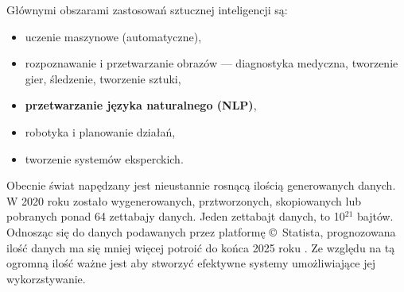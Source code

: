 %
%




\bigskip

\noindent Głównymi obszarami zastosowań sztucznej inteligencji są:
\begin{itemize}
\item uczenie maszynowe (automatyczne),
\item rozpoznawanie i przetwarzanie obrazów --- diagnostyka medyczna, tworzenie gier, śledzenie, tworzenie sztuki,
\item \textbf{przetwarzanie języka naturalnego (NLP)},
\item robotyka i planowanie działań,
\item tworzenie systemów eksperckich.
\end{itemize}


\bigskip

\noindent Obecnie świat napędzany jest nieustannie rosnącą ilością generowanych danych.  W 2020 roku zostało wygenerowanych, prztworzonych, skopiowanych lub pobranych ponad 64 zettabajy danych. Jeden zettabajt danych, to 10$^{21}$ bajtów. Odnosząc się do danych podawanych przez platformę \copyright~Statista, prognozowana ilość danych ma się mniej więcej potroić do końca 2025 roku \cite{Statista}. Ze względu na tą ogromną ilość ważne jest aby stworzyć efektywne systemy umożliwiające jej wykorzstywanie.



